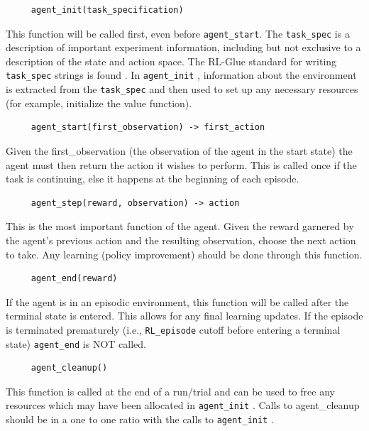 \documentclass[11pt]{article}
\begin{document}
\begin{verbatim}
     agent_init(task_specification)
\end{verbatim}     
This function will be called first, even before \texttt{agent\_start}. The \texttt{task\_spec} is a description of important experiment information, including but not exclusive to a description of the state and action space. The RL-Glue standard for writing \texttt{task\_spec} strings is found .  In \texttt{agent\_init} , information about the environment is extracted from the \texttt{task\_spec} and then used to set up any necessary resources (for example, initialize the value function).

\begin{verbatim}
     agent_start(first_observation) -> first_action
\end{verbatim}
Given the first\_observation (the observation of the agent in the start state) the agent must then return the action it wishes to perform. This is called once if the task is continuing, else it happens at the beginning of each episode.

\begin{verbatim}
     agent_step(reward, observation) -> action
\end{verbatim}
This is the most important function of the agent. Given the reward garnered by the agent's previous action and the resulting observation, choose the next action to take. Any learning (policy improvement) should be done through this function.

\begin{verbatim}
     agent_end(reward)
\end{verbatim}     
If the agent is in an episodic environment, this function will be called after the terminal state is entered. This allows for any final learning updates. If the episode is terminated prematurely (i.e., \texttt{RL\_episode} cutoff before entering a terminal state) \texttt{agent\_end} is NOT called.

\begin{verbatim}
     agent_cleanup()
\end{verbatim}     
This function is called at the end of a run/trial and can be used to free any resources which may have been allocated in \texttt{agent\_init} . Calls to agent\_cleanup should be in a one to one ratio with the calls to \texttt{agent\_init} .
\end{document}
